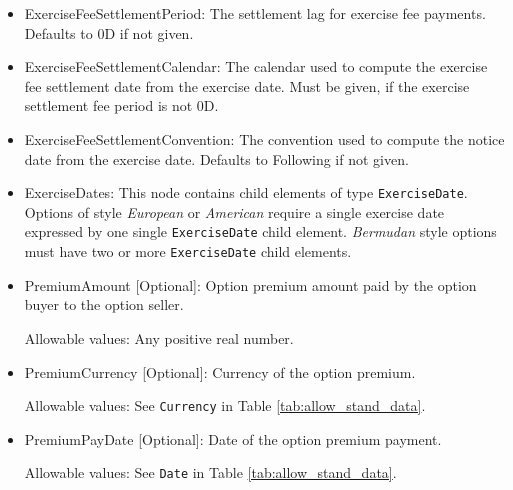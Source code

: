 \begin{itemize}
\item ExerciseFeeSettlementPeriod: The settlement lag for exercise fee payments. Defaults to 0D if not given.

\item ExerciseFeeSettlementCalendar: The calendar used to compute the exercise fee settlement date from the exercise
  date. Must be given, if the exercise settlement fee period is not 0D.

\item ExerciseFeeSettlementConvention: The convention used to compute the notice date from the exercise date. Defaults
  to Following if not given.

\item ExerciseDates: This node contains child elements of type
  \lstinline!ExerciseDate!.  Options of style \emph{European} or
  \emph{American} require a single exercise date expressed by one
  single \lstinline!ExerciseDate! child element.  \emph{Bermudan}
  style options must have two or more \lstinline!ExerciseDate! child
  elements.

\item PremiumAmount [Optional]: Option premium amount paid by the option buyer to the option seller.

Allowable values:  Any positive real number.

\item PremiumCurrency [Optional]: Currency of the option premium.

Allowable values:  See \lstinline!Currency! in Table \ref{tab:allow_stand_data}.

\item PremiumPayDate [Optional]: Date of the option premium payment.

Allowable values:  See \lstinline!Date! in Table \ref{tab:allow_stand_data}.

\end{itemize}

